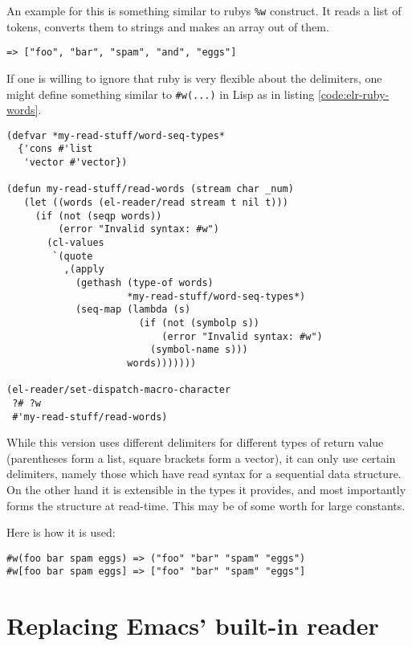 \documentclass[a4paper,10pt,twoside]{report}
\begin{document}
An example for this is something similar to rubys \texttt{\%w} construct.  It
reads a list of tokens, converts them to strings and makes an array out of
them.  

\begin{lstlisting}[style=rubyinline]
%w(foo bar spam and eggs) 
=> ["foo", "bar", "spam", "and", "eggs"]
\end{lstlisting}

If one is willing to ignore that ruby is very flexible about the delimiters, one
might define something similar to \texttt{\#w(...)} in Lisp as in listing
\ref{code:elr-ruby-words}.

\begin{lstlisting}[style=lispcode,caption={A read macro for rubys word
  syntax.}, label={code:elr-ruby-words}]
(defvar *my-read-stuff/word-seq-types*
  {'cons #'list 
   'vector #'vector})

(defun my-read-stuff/read-words (stream char _num)
   (let ((words (el-reader/read stream t nil t)))
     (if (not (seqp words))
         (error "Invalid syntax: #w")
       (cl-values
        `(quote
          ,(apply
            (gethash (type-of words)
                     *my-read-stuff/word-seq-types*)
            (seq-map (lambda (s)
                       (if (not (symbolp s))
                           (error "Invalid syntax: #w")
                         (symbol-name s)))
                     words)))))))

(el-reader/set-dispatch-macro-character
 ?# ?w
 #'my-read-stuff/read-words)
\end{lstlisting}

While this version uses different delimiters for different types of return value
(parentheses form a list, square brackets form a vector), it can only use
certain delimiters, namely those which have read syntax for a sequential data
structure.  On the other hand it is extensible in the types it provides, and
most importantly forms the structure at read-time.  This may be of some worth
for large constants.

Here is how it is used:

\begin{lstlisting}[style=rubyinline]
#w(foo bar spam eggs) => ("foo" "bar" "spam" "eggs")
#w[foo bar spam eggs] => ["foo" "bar" "spam" "eggs"]
\end{lstlisting}

\chapter{Replacing Emacs’ built-in reader}
\label{sec:repl-reader}
\end{document}
